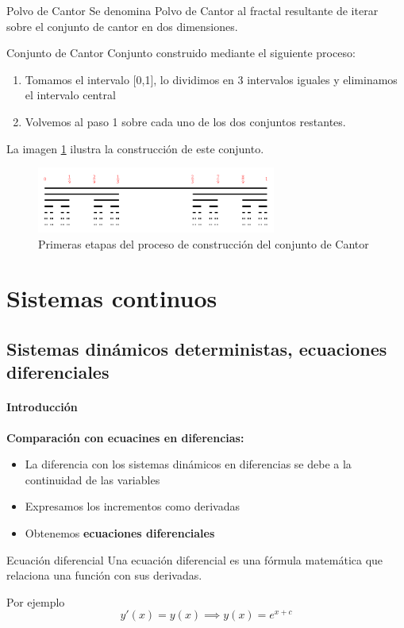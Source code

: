 \documentclass[8pt]{beamer}
\begin{document}
\begin{frame}
\begin{block}{Polvo de Cantor}
Se denomina Polvo de Cantor al fractal resultante de iterar sobre el conjunto de cantor en dos dimensiones.
\end{block}

\begin{block}{Conjunto de Cantor}
Conjunto construido mediante el siguiente proceso:

\begin{enumerate}
\item Tomamos el intervalo [0,1], lo dividimos en 3 intervalos iguales y eliminamos el intervalo central

\item Volvemos al paso 1 sobre cada uno de los dos conjuntos restantes.
\end{enumerate}

La imagen \ref{fig:conjuntoCantor} ilustra la construcción de este conjunto.
\end{block}

\begin{figure}[hbtp]
\centering
\includegraphics[width = 0.7\textwidth]{img/conjuntoCantor.png}
\caption{Primeras etapas del proceso de construcción del conjunto de Cantor}
\label{fig:conjuntoCantor}
\end{figure}

\end{frame}

\section{Sistemas continuos}
\subsection{Sistemas dinámicos deterministas, ecuaciones diferenciales}
\begin{frame}
\framesubtitle{Introducción}

\textbf{Comparación con ecuacines en diferencias:}
\begin{itemize}
\item La diferencia con los sistemas dinámicos en diferencias se debe a la continuidad de las variables
\item Expresamos los incrementos como derivadas
\item Obtenemos \textbf{ecuaciones diferenciales}
\end{itemize}

\begin{block}{Ecuación diferencial}
Una ecuación diferencial es una fórmula matemática que relaciona una función con sus derivadas.

Por ejemplo
\[y'(x) = y(x) \implies y(x) = e^{x+c}\]
\end{block}
\end{frame}
\end{document}
